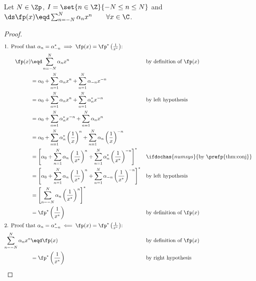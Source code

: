 \begin{theorem}
\label{thm:hsym<==>1/x*}
Let $N\in\Zp$, $I=\set{n\in\Z}{-N\le n\le N}$ and
  $\ds\fp(x) \eqd \sum_{n=-N}^N \alpha_n x^n  \qquad \forall x\in\C$.
\end{theorem}
\begin{proof}
\begin{align*}
\intertext{1. Proof that
  $\alpha_n=\alpha_{-n}^\ast \implies \fp(x) = \fp^\ast\left(\frac{1}{x^\ast}\right)$:
  }
  \fp(x)
    &\eqd\sum_{n=-N}^N \alpha_n x^n
    &&   \text{by definition of $\fp(x)$}
  \\&=   \alpha_0 + \sum_{n=1}^N \alpha_n x^n + \sum_{n=1}^N \alpha_{-n} x^{-n}
  \\&=   \alpha_0 + \sum_{n=1}^N \alpha_n x^n + \sum_{n=1}^N \alpha_n^\ast x^{-n}
    &&   \text{by left hypothesis}
  \\&=   \alpha_0 + \sum_{n=1}^N \alpha_n^\ast x^{-n} + \sum_{n=1}^N \alpha_n x^n
  \\&=   \alpha_0
       + \sum_{n=1}^N \alpha_n^\ast \left(\frac{1}{x}\right)^n
       + \sum_{n=1}^N \alpha_n \left(\frac{1}{x}\right)^{-n}
  \\&=   \left[\alpha_0
       + \sum_{n=1}^N \alpha_n \left(\frac{1}{x^\ast}\right)^n
       + \sum_{n=1}^N \alpha_n^\ast \left(\frac{1}{x^\ast}\right)^{-n}
         \right]^\ast
    &&   \ifdochas{numsys}{\text{by \prefp{thm:conj}}}
  \\&=   \left[\alpha_0
       + \sum_{n=1}^N \alpha_n    \left(\frac{1}{x^\ast}\right)^n
       + \sum_{n=1}^N \alpha_{-n} \left(\frac{1}{x^\ast}\right)^{-n}
         \right]^\ast
    &&   \text{by left hypothesis}
  \\&=   \left[
           \sum_{n=-N}^N \alpha_n    \left(\frac{1}{x^\ast}\right)^n
         \right]^\ast
  \\&= \fp^\ast\left(\frac{1}{x^\ast}\right)
    &&   \text{by definition of $\fp(x)$}
  \\
\intertext{2. Proof that
  $\alpha_n=\alpha_{-n}^\ast \impliedby \fp(x) = \fp^\ast\left(\frac{1}{x^\ast}\right)$:
  }
  \sum_{n=-N}^N \alpha_n x^n
    &\eqd\fp(x)
    &&   \text{by definition of $\fp(x)$}
  \\&=   \fp^\ast\left(\frac{1}{x^\ast}\right)
    &&   \text{by right hypothesis}

\end{align*}
\end{proof}
